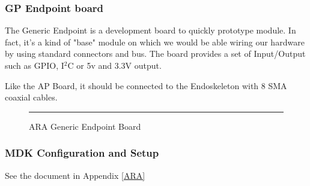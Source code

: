\subsubsection{GP Endpoint board}

The Generic Endpoint is a development board to quickly prototype module. In fact, it's a kind of "base" module on which we would be able wiring our hardware by using standard connectors and bus. The board provides a set of Input/Output such as GPIO, I$^2$C or 5v and 3.3V output.

Like the AP Board, it should be connected to the Endoskeleton with 8 SMA coaxial cables.

\begin{figure}[htbp]
  \centering
    \rule{35em}{0.5pt}
  \caption[ARA Generic Endpoint Board]{ARA Generic Endpoint Board}
  \label{fig:gpendpoint}
\end{figure}

\subsubsection{MDK Configuration and Setup}

See the document in Appendix \ref{ARA}